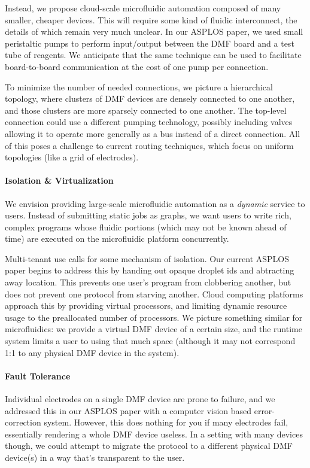 \documentclass[sigplan, screen, nonacm]{acmart}
\begin{document}
Instead, we propose cloud-scale microfluidic automation composed of many smaller, cheaper devices.
This will require some kind of fluidic interconnect, the details of which remain very much unclear.
In our ASPLOS paper, we used small peristaltic pumps to perform input/output between the DMF board and a test tube of reagents.
We anticipate that the same technique can be used to facilitate board-to-board communication at the cost of one pump per connection.

To minimize the number of needed connections, we picture a hierarchical topology, where clusters of DMF devices are densely connected to one another, and those clusters are more sparsely connected to one another.
The top-level connection could use a different pumping technology, possibly including valves allowing it to operate more generally as a bus instead of a direct connection.
All of this poses a challenge to current routing techniques, which focus on uniform topologies (like a grid of electrodes).

\paragraph{Isolation \& Virtualization}
We envision providing large-scale microfluidic automation as a \emph{dynamic} service to users.
Instead of submitting static jobs as graphs, we want users to write rich, complex programs whose fluidic portions (which may not be known ahead of time) are executed on the microfluidic platform concurrently.

Multi-tenant use calls for some mechanism of isolation.
Our current ASPLOS paper begins to address this by handing out opaque droplet ids and abtracting away location.
This prevents one user's program from clobbering another, but does not prevent one protocol from starving another.
Cloud computing platforms approach this by providing virtual processors, and limiting dynamic resource usage to the preallocated number of processors.
We picture something similar for microfluidics: we provide a virtual DMF device of a certain size\footnotemark, and the runtime system limits a user to using that much space (although it may not correspond 1:1 to any physical DMF device in the system).

\paragraph{Fault Tolerance}
Individual electrodes on a single DMF device are prone to failure, and we addressed this in our ASPLOS paper with a computer vision based error-correction system.
However, this does nothing for you if many electrodes fail, essentially rendering a whole DMF device useless.
In a setting with many devices though, we could attempt to migrate the protocol to a different physical DMF device(s) in a way that's transparent to the user.

\end{document}
